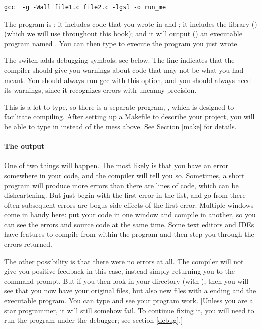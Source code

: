 \documentclass[12pt]{article}
\def\ind#1{\index{#1}#1}
\begin{document}
\begin{verbatim}
gcc  -g -Wall file1.c file2.c -lgsl -o run_me
\end{verbatim}

The program is ; it includes code that you wrote in
 and ; it includes the library
()  (which we will use throughout this book);
and it will output () an executable program named . You
can then type  to execute the program you just wrote.

The  switch adds \ind{debugging} symbols; see below.  The
 line indicates that the compiler should give you warnings
about code that may not be what you had meant. You should always run
gcc with this option, and you should always heed its warnings, since it
recognizes errors with uncanny precision.

This is a lot to type, so there is a separate program, ,
which is designed to facilitate compiling. After setting up a Makefile
to describe your project, you will be able to type in  instead
of the mess above. See Section \ref{make} for details.

\paragraph{The output} One of two things will happen. The most likely is
that you have an error somewhere in your code, and the compiler will tell
you so. Sometimes, a short program will produce more errors than there
are lines of code, which can be disheartening. But just begin with the
first error in the list, and go from there---often subsequent errors are
bogus side-effects of the first error. Multiple windows come in handy
here: put your code in one window and compile in another, so you can
see the errors and source code at the same time. Some text editors and
IDEs have features to compile from within the program and then step you
through the errors returned.

The other possibility is that there were no errors at all. The compiler
will not give you positive feedback in this case, instead simply returning
you to the command prompt. But if you then look in your directory
(with ), then you will see that you now have your original
 files, but also new files with a  ending and the
 executable program. You can type 
and see your program work. [Unless you are a star programmer, it will
still somehow fail. To continue fixing it, you will need to run the
program under the debugger; see section \ref{debug}.]
\end{document}
